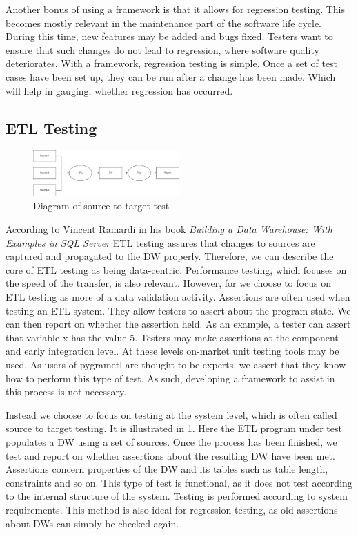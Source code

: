 Another bonus of using a framework is that it allows for regression testing. This becomes mostly relevant in the maintenance part of the software life cycle. During this time, new features may be added and bugs fixed. Testers want to ensure that such changes do not lead to regression, where software quality deteriorates. With a framework, regression testing is simple. Once a set of test cases have been set up, they can be run after a change has been made. Which will help in gauging, whether regression has occurred.

\subsection{ETL Testing}

\begin{figure}
\centering
\includegraphics[width=0.5\textwidth]{figures/scenario.pdf}
\caption{Diagram of source to target test}
\label{fig:sourcetotarget}
\end{figure}

According to Vincent Rainardi in his book \textit{Building a Data Warehouse: With Examples in SQL Server}\cite{rainardi2007building} ETL testing assures that changes to sources are captured and propagated to the DW properly. Therefore, we can describe the core of ETL testing as being data-centric. Performance testing, which focuses on the speed of the transfer, is also relevant. However, for \FW{} we choose to focus on ETL testing as more of a data validation activity. Assertions are often used when testing an ETL system. They allow testers to assert about the program state. We can then report on whether the assertion held. As an example, a tester can assert that variable x has the value 5. Testers may make assertions at the component and early integration level. At these levels on-market unit testing tools may be used. As users of pygrametl are thought to be experts, we assert that they know how to perform this type of test. As such, developing a framework to assist in this process is not necessary.

Instead we choose to focus on testing at the system level, which is often called source to target testing. It is illustrated in \cref{fig:sourcetotarget}. Here the ETL program under test populates a DW using a set of sources. Once the process has been finished, we test and report on whether assertions about the resulting DW have been met. Assertions concern properties of the DW and its tables such as table length, constraints and so on. This type of test is functional, as it does not test according to the internal structure of the system. Testing is performed according to system requirements. This method is also ideal for regression testing, as old assertions about DWs can simply be checked again.

